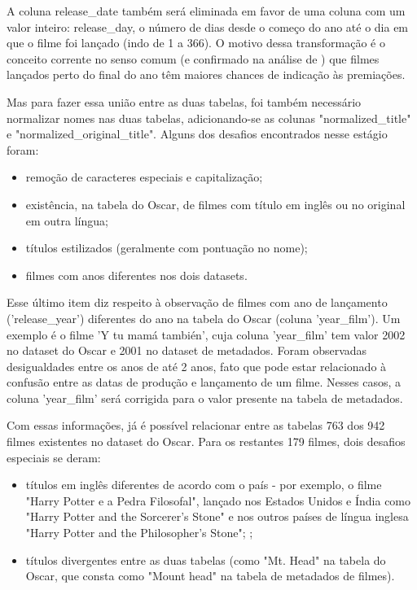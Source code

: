             A coluna release\_date também será eliminada em favor de uma coluna com um valor inteiro: release\_day, o número de dias desde o começo do ano até o dia em que o filme foi lançado (indo de 1 a 366). O motivo dessa transformação é o conceito corrente no senso comum (e confirmado na análise de ) que filmes lançados perto do final do ano têm maiores chances de indicação às premiações.

            Mas para fazer essa união entre as duas tabelas, foi também necessário normalizar nomes nas duas tabelas, adicionando-se as colunas "normalized\_title" e "normalized\_original\_title". Alguns dos desafios encontrados nesse estágio foram:

            \begin{itemize}
                \item remoção de caracteres especiais e capitalização;
                \item existência, na tabela do Oscar, de filmes com título em inglês ou no original em outra língua;
                \item títulos estilizados (geralmente com pontuação no nome);
                \item filmes com anos diferentes nos dois datasets.
            \end{itemize}

            Esse último item diz respeito à observação de filmes com ano de lançamento ('release\_year') diferentes do ano na tabela do Oscar (coluna 'year\_film'). Um exemplo é o filme 'Y tu mamá también', cuja coluna 'year\_film' tem valor 2002 no dataset do Oscar e 2001 no dataset de metadados. Foram observadas desigualdades entre os anos de até 2 anos, fato que pode estar relacionado à confusão entre as datas de produção e lançamento de um filme. Nesses casos, a coluna 'year\_film' será corrigida para o valor presente na tabela de metadados.


            Com essas informações, já é possível relacionar entre as tabelas 763 dos 942 filmes existentes no dataset do Oscar. Para os restantes 179 filmes, dois desafios especiais se deram:\par

            \begin{itemize}
                \item títulos em inglês diferentes de acordo com o país - por exemplo, o filme "Harry Potter e a Pedra Filosofal", lançado nos Estados Unidos e Índia como "Harry Potter and the Sorcerer's Stone" e nos outros países de língua inglesa "Harry Potter and the Philosopher's Stone"; \cite{yahoo2000};\par
                \item títulos divergentes entre as duas tabelas (como "Mt. Head" na tabela do Oscar, que consta como "Mount head" na tabela de metadados de filmes).\par
            \end{itemize}

